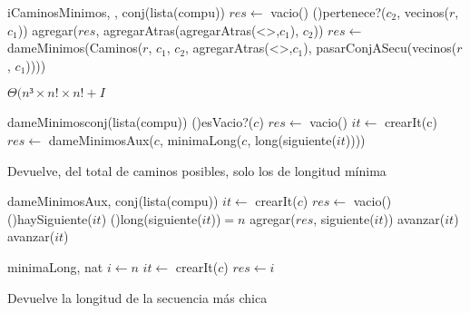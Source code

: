 \begin{Algoritmos}
  \begin{algoritmo}{iCaminosMinimos}{, , }{conj(lista(compu))}{}
    $res \gets$ vacio()
    \eIf(){pertenece?($c_{2}$, vecinos($r$, $c_{1}$))}{
      agregar($res$, agregarAtras(agregarAtras(<>,$c_{1}$), $c_{2}$))
    }{
      $res \gets$ dameMinimos(Caminos($r$, $c_{1}$, $c_{2}$, agregarAtras(<>,$c_{1}$), pasarConjASecu(vecinos($r$, $c_{1}$))))
    }
  \end{algoritmo}
  \datosAlgoritmo{} %
  {} %
  {} %
  {$\Theta(n³ \times n! \times n! + I$} %
  {} %

  \begin{algoritmo}{dameMinimos}{}{conj(lista(compu))}
    \eIf(){esVacio?($c$)}{
      $res \gets$ vacio()
    }{
       $it \gets$ crearIt(c)
      $res \gets$ dameMinimosAux($c$, minimaLong($c$, long(siguiente($it$))))
    }
  \end{algoritmo}
  \datosAlgoritmo{} %
  {} %
  {} %
  {} %
  {Devuelve, del total de caminos posibles, solo los de longitud m\'{i}nima} %

  \begin{algoritmo}{dameMinimosAux}{, }{conj(lista(compu))}
     $it \gets$ crearIt($c$)
    $res \gets$ vacio()\;
    \While(){haySiguiente($it$)}{
      \eIf(){long(siguiente($it$))$=n$}{
        agregar($res$, siguiente($it$))
        avanzar($it$) 
      }{
        avanzar($it$) 
      }
    }
  \end{algoritmo}
  \datosAlgoritmo{} %
  {} %
  {} %
  {} %
  {} %

  \begin{algoritmo}{minimaLong}{, }{nat}
     $i \gets n$
     $it \gets$ crearIt($c$)
    $res \gets i$
  \end{algoritmo}
  \datosAlgoritmo{} %
  {} %
  {} %
  {} %
  {Devuelve la longitud de la secuencia m\'{a}s chica} %
    

\end{Algoritmos}
